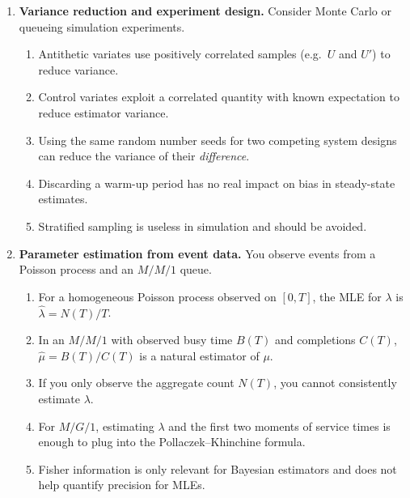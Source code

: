 \documentclass[a4paper,11pt]{article}
\begin{document}
\begin{enumerate}
\item \textbf{Variance reduction and experiment design.} Consider Monte Carlo or queueing simulation experiments.
  \begin{enumerate}
    \item Antithetic variates use positively correlated samples (e.g.\ $U$ and $U'$) to reduce variance.
    \item Control variates exploit a correlated quantity with known expectation to reduce estimator variance.
    \item Using the same random number seeds for two competing system designs can reduce the variance of their \emph{difference}.
    \item Discarding a warm-up period has no real impact on bias in steady-state estimates.
    \item Stratified sampling is useless in simulation and should be avoided.
  \end{enumerate}

\item \textbf{Parameter estimation from event data.} You observe events from a Poisson process and an $M/M/1$ queue.
  \begin{enumerate}
    \item For a homogeneous Poisson process observed on $[0,T]$, the MLE for $\lambda$ is $\hat\lambda = N(T)/T$.
    \item In an $M/M/1$ with observed busy time $B(T)$ and completions $C(T)$, $\hat\mu = B(T)/C(T)$ is a natural estimator of $\mu$.
    \item If you only observe the aggregate count $N(T)$, you cannot consistently estimate $\lambda$.
    \item For $M/G/1$, estimating $\lambda$ and the first two moments of service times is enough to plug into the Pollaczek--Khinchine formula.
    \item Fisher information is only relevant for Bayesian estimators and does not help quantify precision for MLEs.
  \end{enumerate}


\end{enumerate}
\end{document}
